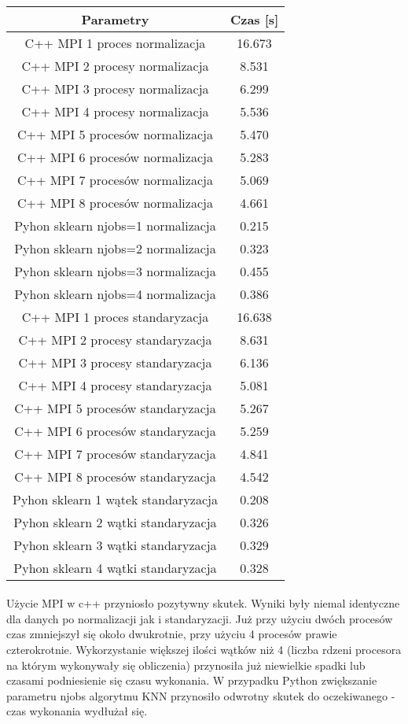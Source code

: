 \documentclass[a4paper,11pt]{article}
\begin{document}
\paragraph{}
\begin{tabular}{|c|c|}
\hline Parametry&Czas [s] \\ 
\hline C++ MPI 1 proces normalizacja& 16.673 \\
\hline C++ MPI 2 procesy normalizacja& 8.531 \\
\hline C++ MPI 3 procesy normalizacja& 6.299  \\
\hline C++ MPI 4 procesy normalizacja& 5.536 \\
\hline C++ MPI 5 procesów normalizacja& 5.470 \\
\hline C++ MPI 6 procesów normalizacja& 5.283 \\
\hline C++ MPI 7 procesów normalizacja& 5.069  \\
\hline C++ MPI 8 procesów normalizacja& 4.661 \\\hline
\hline Pyhon sklearn njobs=1 normalizacja& 0.215 \\
\hline Pyhon sklearn njobs=2 normalizacja& 0.323 \\
\hline Pyhon sklearn njobs=3 normalizacja& 0.455 \\
\hline Pyhon sklearn njobs=4 normalizacja& 0.386 \\\hline
\hline C++ MPI 1 proces standaryzacja& 16.638 \\
\hline C++ MPI 2 procesy standaryzacja& 8.631 \\ 
\hline C++ MPI 3 procesy standaryzacja& 6.136 \\ 
\hline C++ MPI 4 procesy standaryzacja& 5.081 \\
\hline C++ MPI 5 procesów standaryzacja& 5.267 \\
\hline C++ MPI 6 procesów standaryzacja& 5.259 \\ 
\hline C++ MPI 7 procesów standaryzacja& 4.841 \\ 
\hline C++ MPI 8 procesów standaryzacja& 4.542 \\
\hline
\hline Pyhon sklearn 1 wątek standaryzacja& 0.208 \\
\hline Pyhon sklearn 2 wątki standaryzacja& 0.326 \\
\hline Pyhon sklearn 3 wątki standaryzacja& 0.329 \\
\hline Pyhon sklearn 4 wątki standaryzacja& 0.328 \\\hline
\end{tabular}
\paragraph{}
Użycie MPI w c++ przyniosło pozytywny skutek. Wyniki były niemal identyczne dla danych po normalizacji jak i standaryzacji. Już przy użyciu dwóch procesów czas zmniejszył się około dwukrotnie, przy użyciu 4 procesów prawie czterokrotnie. Wykorzystanie większej ilości wątków niż 4 (liczba rdzeni procesora na którym wykonywały się obliczenia) przynosiła już niewielkie spadki lub czasami podniesienie się czasu wykonania. 
W przypadku Python zwiększanie parametru njobs algorytmu KNN przynosiło odwrotny skutek do oczekiwanego - czas wykonania wydłużał się.
\end{document}
